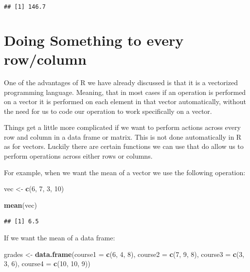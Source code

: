 \documentclass[
]{book}
\newenvironment{Shaded}{\begin{snugshade}}{\end{snugshade}}
\newcommand{\AttributeTok}[1]{\textcolor[rgb]{0.13,0.29,0.53}{#1}}
\newcommand{\DecValTok}[1]{\textcolor[rgb]{0.00,0.00,0.81}{#1}}
\newcommand{\FunctionTok}[1]{\textcolor[rgb]{0.13,0.29,0.53}{\textbf{#1}}}
\newcommand{\NormalTok}[1]{#1}
\newcommand{\OtherTok}[1]{\textcolor[rgb]{0.56,0.35,0.01}{#1}}
\begin{document}
\begin{verbatim}
## [1] 146.7
\end{verbatim}

\section{Doing Something to every row/column}\label{doing-something-to-every-rowcolumn}

One of the advantages of R we have already discussed is that it is a vectorized programming language. Meaning, that in most cases if an operation is performed on a vector it is performed on each element in that vector automatically, without the need for us to code our operation to work specifically on a vector.

Things get a little more complicated if we want to perform actions across every row and column in a data frame or matrix. This is not done automatically in R as for vectors. Luckily there are certain functions we can use that do allow us to perform operations across either rows or columns.

For example, when we want the mean of a vector we use the following operation:

\begin{Shaded}
\begin{Highlighting}[]
\NormalTok{vec }\OtherTok{\textless{}{-}} \FunctionTok{c}\NormalTok{(}\DecValTok{6}\NormalTok{, }\DecValTok{7}\NormalTok{, }\DecValTok{3}\NormalTok{, }\DecValTok{10}\NormalTok{)}

\FunctionTok{mean}\NormalTok{(vec)}
\end{Highlighting}
\end{Shaded}

\begin{verbatim}
## [1] 6.5
\end{verbatim}

If we want the mean of a data frame:

\begin{Shaded}
\begin{Highlighting}[]
\NormalTok{grades }\OtherTok{\textless{}{-}} \FunctionTok{data.frame}\NormalTok{(}\AttributeTok{course1 =} \FunctionTok{c}\NormalTok{(}\DecValTok{6}\NormalTok{, }\DecValTok{4}\NormalTok{, }\DecValTok{8}\NormalTok{),}
                     \AttributeTok{course2 =} \FunctionTok{c}\NormalTok{(}\DecValTok{7}\NormalTok{, }\DecValTok{9}\NormalTok{, }\DecValTok{8}\NormalTok{),}
                     \AttributeTok{course3 =} \FunctionTok{c}\NormalTok{(}\DecValTok{3}\NormalTok{, }\DecValTok{3}\NormalTok{, }\DecValTok{6}\NormalTok{),}
                     \AttributeTok{course4 =} \FunctionTok{c}\NormalTok{(}\DecValTok{10}\NormalTok{, }\DecValTok{10}\NormalTok{, }\DecValTok{9}\NormalTok{))}
\end{Highlighting}
\end{Shaded}
\end{document}
